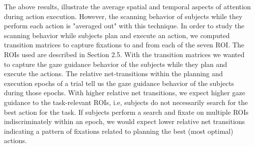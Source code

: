 The above results, illustrate the average spatial and temporal aspects of attention during action execution. However, the scanning behavior of subjects while they perform each action is "averaged out" with this technique. In order to study the scanning behavior while subjects plan and execute an action, we computed transition matrices to capture fixations to and from each of the seven ROI. The ROIs used are described in Section 2.5. With the transition matrices we wanted to capture the gaze guidance behavior of the subjects while they plan and execute the actions. The relative net-transitions within the planning and execution epochs of a trial tell us the gaze guidance behavior of the subjects during those epochs. With higher relative net transitions, we expect higher gaze guidance to the task-relevant ROIs, i.e, subjects do not necessarily search for the best action for the task. If subjects perform a search and fixate on multiple ROIs indiscriminately within an epoch, we would expect lower relative net transitions indicating a pattern of fixations related to planning the best (most optimal) actions. 

